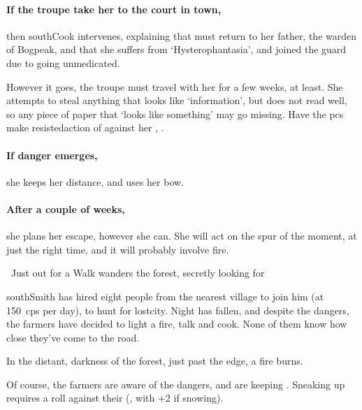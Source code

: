 \paragraph{If the troupe take her to the \gls{court} in \gls{town},}
then \gls{southCook} intervenes, explaining that  must return to her father, the \gls{warden} of Bogpeak, and that she suffers from `Hysterophantasia', and joined the \gls{guard} due to going unmedicated.

However it goes, the troupe must travel with her for a few weeks, at least.
She attempts to steal anything that looks like `information', but does not read well, so any piece of paper that `looks like something' may go missing.
Have the \glspl{pc} make \gls{resistedaction} of  against her , \tn.

\paragraph{If danger emerges,}
she keeps her distance, and uses her bow.

\paragraph{After a couple of weeks,}
she plans her escape, however she can.
She will act on the spur of the moment, at just the right time, and it will probably involve fire.

{~Just out for a Walk}%
{ wanders the forest, secretly looking for }%

\begin{exampletext}
  \Gls{southSmith} has hired eight people from the nearest \gls{village} to join him (at 150~\glspl{cp} per day), to hunt for \gls{lostcity}.
  Night has fallen, and despite the dangers, the farmers have decided to light a fire, talk and cook.
  None of them know how close they've come to the road.
\end{exampletext}

\begin{boxtext}
  In the distant, darkness of the forest, just past the \gls{edge}, a fire burns.
\end{boxtext}


Of course, the farmers are aware of the dangers, and are keeping .
Sneaking up requires a  roll against their  (\tn, with +2 if snowing).

